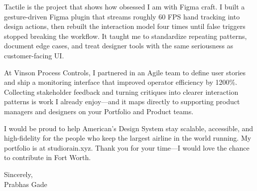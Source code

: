 \documentclass[letterpaper,11pt]{letter}
\begin{document}
Tactile is the project that shows how obsessed I am with Figma craft. I built a gesture-driven Figma plugin that streams roughly 60 FPS hand tracking into design actions, then rebuilt the interaction model four times until false triggers stopped breaking the workflow. It taught me to standardize repeating patterns, document edge cases, and treat designer tools with the same seriousness as customer-facing UI.

At Vinson Process Controls, I partnered in an Agile team to define user stories and ship a monitoring interface that improved operator efficiency by 1200\%. Collecting stakeholder feedback and turning critiques into clearer interaction patterns is work I already enjoy---and it maps directly to supporting product managers and designers on your Portfolio and Product teams.

I would be proud to help American's Design System stay scalable, accessible, and high-fidelity for the people who keep the largest airline in the world running. My portfolio is at studiorain.xyz. Thank you for your time---I would love the chance to contribute in Fort Worth.

Sincerely,\\
Prabhas Gade
\end{document}
